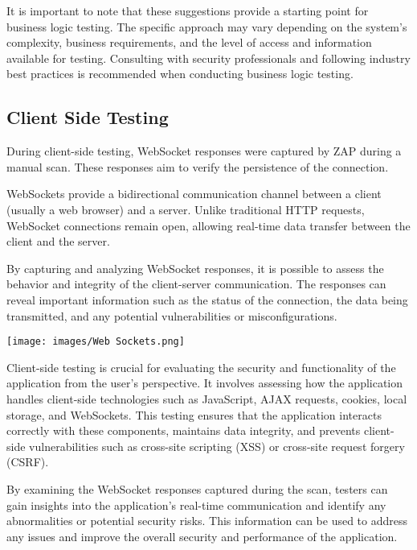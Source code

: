 \documentclass[12pt]{article}
\begin{document}
It is important to note that these suggestions provide a starting point for business logic testing. The specific approach may vary depending on the system's complexity, business requirements, and the level of access and information available for testing. Consulting with security professionals and following industry best practices is recommended when conducting business logic testing.

\subsection{Client Side Testing}
During client-side testing, WebSocket responses were captured by ZAP during a manual scan. These responses aim to verify the persistence of the connection.

WebSockets provide a bidirectional communication channel between a client (usually a web browser) and a server. Unlike traditional HTTP requests, WebSocket connections remain open, allowing real-time data transfer between the client and the server.

By capturing and analyzing WebSocket responses, it is possible to assess the behavior and integrity of the client-server communication. The responses can reveal important information such as the status of the connection, the data being transmitted, and any potential vulnerabilities or misconfigurations.

\begin{center}
    \texttt{[image: images/Web Sockets.png]}
\end{center}


Client-side testing is crucial for evaluating the security and functionality of the application from the user's perspective. It involves assessing how the application handles client-side technologies such as JavaScript, AJAX requests, cookies, local storage, and WebSockets. This testing ensures that the application interacts correctly with these components, maintains data integrity, and prevents client-side vulnerabilities such as cross-site scripting (XSS) or cross-site request forgery (CSRF).

By examining the WebSocket responses captured during the scan, testers can gain insights into the application's real-time communication and identify any abnormalities or potential security risks. This information can be used to address any issues and improve the overall security and performance of the application.
\end{document}
